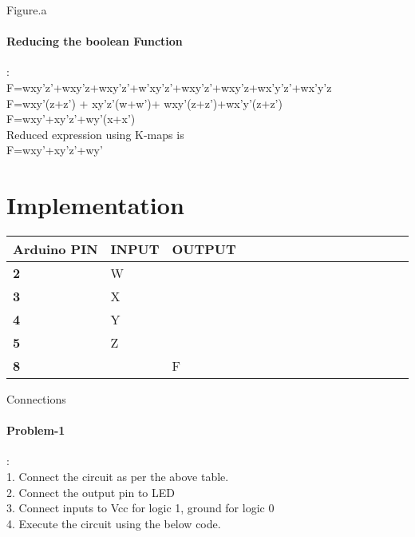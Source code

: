 \documentclass[10pt, a4paper]{article}
\begin{document}
    

\begin{center}
Figure.a
\end{center}
  

 \paragraph {Reducing the boolean Function}:\\
    F=wxy'z'+wxy'z+wxy'z'+w'xy'z'+wxy'z'+wxy'z+wx'y'z'+wx'y'z\\
    F=wxy'(z+z') + xy'z'(w+w')+ wxy'(z+z')+wx'y'(z+z')\\
    F=wxy'+xy'z'+wy'(x+x')\\
 Reduced expression using K-maps is\\
 F=wxy'+xy'z'+wy'\\

    
\section{Implementation}
  \begin{tabularx}{0.46\textwidth} { 
  | >{\centering\arraybackslash}X 
  | >{\centering\arraybackslash}X 
  | >{\centering\arraybackslash}X
  | >{\centering\arraybackslash}X 
  | >{\centering\arraybackslash}X 
  | >{\centering\arraybackslash}X 
  | >{\centering\arraybackslash}X 
  | >{\centering\arraybackslash}X 
  | >{\centering\arraybackslash}X
  | >{\centering\arraybackslash}X
  | >{\centering\arraybackslash}X
  | >{\centering\arraybackslash}X
  | >{\centering\arraybackslash}X
  | >{\centering\arraybackslash}X
  | >{\centering\arraybackslash}X 
  | >{\centering\arraybackslash}X | }


\hline
\textbf{Arduino PIN} & \textbf{INPUT} & \textbf{OUTPUT} \\ 
\hline
\textbf 2 & W & \\
\hline
\textbf 3 & X & \\
\hline
\textbf 4 & Y & \\
\hline
\textbf 5 & Z & \\
\hline
\textbf 8 & & F \\
\hline
\end{tabularx}

\begin{center}
    Connections
\end{center}

    \paragraph{Problem-1}:\\
    1. Connect the circuit as per the above table.\\
    2. Connect the output pin to LED\\
    3. Connect inputs to Vcc for logic 1, ground for logic 0\\
    4. Execute the circuit using the below code.\\
  
\end{document}
